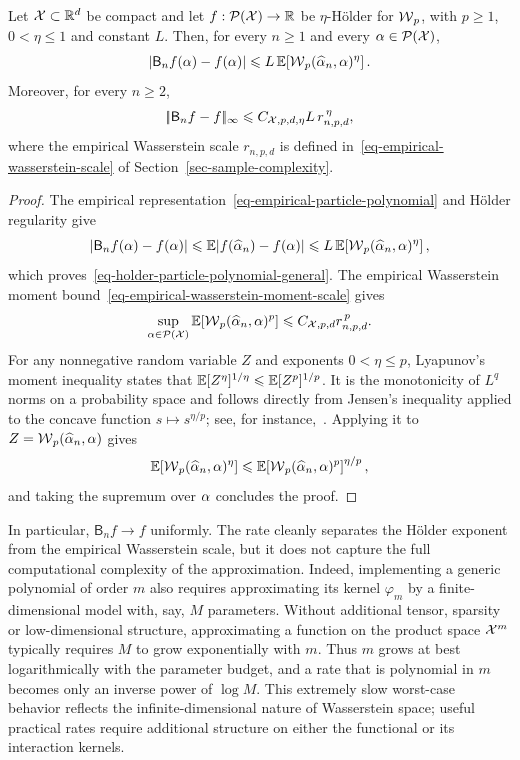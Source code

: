 \begin{prop}\label{prop-holder-particle-polynomial}
	Let \(\mathcal{X}\subset\mathbb{R}^d\) be compact and let \(f:\mathcal{P}(\mathcal{X})\to\mathbb{R}\) be \(\eta\)-H\"older for \(\operatorname{\mathcal{W}}_p\), with \(p\geq1\), \(0<\eta\leq1\) and constant \(L\). Then, for every $n\geq1$ and every \(\alpha\in\mathcal{P}(\mathcal{X})\),
	\begin{equation}\label{eq-holder-particle-polynomial-general}
		\left|\mathsf B_n f(\alpha)-f(\alpha)\right|
		\leqslant
		L\,\mathbb{E}\!\left[\operatorname{\mathcal{W}}_p(\widehat{\alpha}_n,\alpha)^\eta\right].
	\end{equation}
	Moreover, for every $n\geq2$,
	\begin{equation}\label{eq-holder-particle-polynomial-rate}
		|\!| \mathsf B_n f-f |\!|_{\infty}
		\leqslant
		C_{\mathcal{X},p,d,\eta}L\,r_{n,p,d}^{\,\eta},
	\end{equation}
	where the empirical Wasserstein scale \(r_{n,p,d}\) is defined in~\eqref{eq-empirical-wasserstein-scale} of Section~\ref{sec-sample-complexity}.
\end{prop}
\begin{proof}
	The empirical representation~\eqref{eq-empirical-particle-polynomial} and H\"older regularity give
	\[
		|\mathsf B_n f(\alpha)-f(\alpha)|
		\leqslant
		\mathbb{E}|f(\widehat{\alpha}_n)-f(\alpha)|
		\leqslant
		L\,\mathbb{E}\!\left[\operatorname{\mathcal{W}}_p(\widehat{\alpha}_n,\alpha)^\eta\right],
	\]
	which proves~\eqref{eq-holder-particle-polynomial-general}. The empirical Wasserstein moment bound~\eqref{eq-empirical-wasserstein-moment-scale} gives
	\[
		\sup_{\alpha\in\mathcal{P}(\mathcal{X})}\mathbb{E}[\operatorname{\mathcal{W}}_p(\widehat{\alpha}_n,\alpha)^p]
		\leqslant C_{\mathcal{X},p,d}r_{n,p,d}^{\,p}.
	\]
	For any nonnegative random variable \(Z\) and exponents \(0<\eta\leq p\), Lyapunov's moment inequality states that
	\(\mathbb{E}[Z^\eta]^{1/\eta}\leqslant\mathbb{E}[Z^p]^{1/p}\).
	It is the monotonicity of \(L^q\) norms on a probability space and follows directly from Jensen's inequality applied to the concave function \(s\mapsto s^{\eta/p}\); see, for instance,~\cite{bogachev2007measure}. Applying it to \(Z=\operatorname{\mathcal{W}}_p(\widehat{\alpha}_n,\alpha)\) gives
	\[
		\mathbb{E}\!\left[\operatorname{\mathcal{W}}_p(\widehat{\alpha}_n,\alpha)^\eta\right]
		\leqslant
		\mathbb{E}\!\left[\operatorname{\mathcal{W}}_p(\widehat{\alpha}_n,\alpha)^p\right]^{\eta/p},
	\]
	and taking the supremum over \(\alpha\) concludes the proof.
\end{proof}

In particular, \(\mathsf B_n f\to f\) uniformly. The rate cleanly separates the H\"older exponent from the empirical Wasserstein scale, but it does not capture the full computational complexity of the approximation. Indeed, implementing a generic polynomial of order \(m\) also requires approximating its kernel \(\varphi_m\) by a finite-dimensional model with, say, \(M\) parameters. Without additional tensor, sparsity or low-dimensional structure, approximating a function on the product space \(\mathcal{X}^m\) typically requires \(M\) to grow exponentially with \(m\). Thus \(m\) grows at best logarithmically with the parameter budget, and a rate that is polynomial in \(m\) becomes only an inverse power of \(\log M\). This extremely slow worst-case behavior reflects the infinite-dimensional nature of Wasserstein space; useful practical rates require additional structure on either the functional or its interaction kernels.

